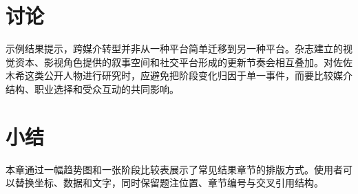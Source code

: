 \section{讨论}

示例结果提示，跨媒介转型并非从一种平台简单迁移到另一种平台。杂志建立的视觉资本、影视角色提供的叙事空间和社交平台形成的更新节奏会相互叠加。对佐佐木希这类公开人物进行研究时，应避免把阶段变化归因于单一事件，而要比较媒介结构、职业选择和受众互动的共同影响。

\section{小结}

本章通过一幅趋势图和一张阶段比较表展示了常见结果章节的排版方式。使用者可以替换坐标、数据和文字，同时保留题注位置、章节编号与交叉引用结构。
